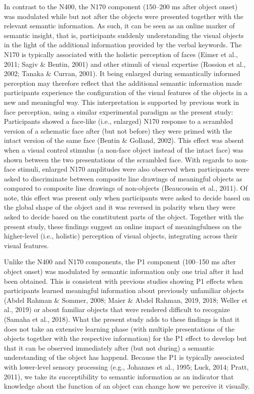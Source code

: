 \documentclass[
  english,
  doc,12pt,twoside,floatsintext]{apa7}
\begin{document}
In contrast to the N400, the N170 component (150--200 ms after object onset) was modulated while but not after the objects were presented together with the relevant semantic information. As such, it can be seen as an online marker of semantic insight, that is, participants suddenly understanding the visual objects in the light of the additional information provided by the verbal keywords. The N170 is typically associated with the holistic perception of faces (Eimer et al., 2011; Sagiv \& Bentin, 2001) and other stimuli of visual expertise (Rossion et al., 2002; Tanaka \& Curran, 2001). It being enlarged during semantically informed perception may therefore reflect that the additional semantic information made participants experience the configuration of the visual features of the objects in a new and meaningful way. This interpretation is supported by previous work in face perception, using a similar experimental paradigm as the present study: Participants showed a face-like (i.e., enlarged) N170 response to a scrambled version of a schematic face after (but not before) they were primed with the intact version of the same face (Bentin \& Golland, 2002). This effect was absent when a visual control stimulus (a non-face object instead of the intact face) was shown between the two presentations of the scrambled face. With regards to non-face stimuli, enlarged N170 amplitudes were also observed when participants were asked to discriminate between composite line drawings of meaningful objects as compared to composite line drawings of non-objects (Beaucousin et al., 2011). Of note, this effect was present only when participants were asked to decide based on the global shape of the object and it was reversed in polarity when they were asked to decide based on the constitutent parts of the object. Together with the present study, these findings suggest an online impact of meaningfulness on the higher-level (i.e., holistic) perception of visual objects, integrating across their visual features.

Unlike the N400 and N170 components, the P1 component (100--150 ms after object onset) was modulated by semantic information only one trial after it had been obtained. This is consistent with previous studies showing P1 effects when participants learned meaningful information about previously unfamiliar objects (Abdel Rahman \& Sommer, 2008; Maier \& Abdel Rahman, 2019, 2018; Weller et al., 2019) or about familiar objects that were rendered difficult to recognize (Samaha et al., 2018). What the present study adds to these findings is that it does not take an extensive learning phase (with multiple presentations of the objects together with the respective information) for the P1 effect to develop but that it can be observed immediately after (but not during) a semantic understanding of the object has happend. Because the P1 is typically associated with lower-level sensory processing (e.g., Johannes et al., 1995; Luck, 2014; Pratt, 2011), we take its succeptibility to semantic information as an indicator that knowledge about the function of an object can change how we perceive it visually.
\end{document}
